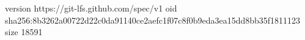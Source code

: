 version https://git-lfs.github.com/spec/v1
oid sha256:8b3262a00722d22c0da91140ce2aefc1f07c8f0b9eda3ea15dd8bb35f1811123
size 18591
